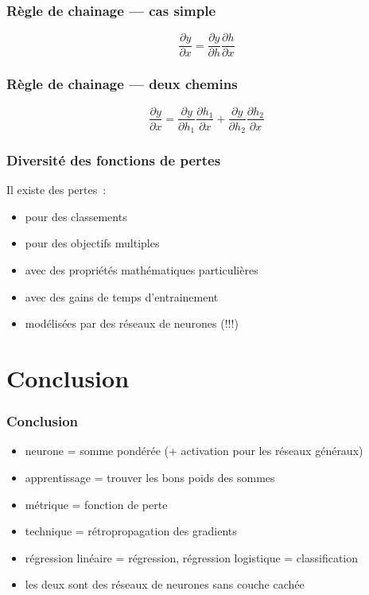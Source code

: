 \documentclass{formation}
\begin{document}
\begin{frame}
  \frametitle{Règle de chainage --- cas simple}

  \[
    \frac{\partial y}{\partial x} = \frac{\partial y}{\partial h}
    \frac{\partial h}{\partial x}
  \]
\end{frame}


\begin{frame}
  \frametitle{Règle de chainage --- deux chemins}

  \[
    \frac{\partial y}{\partial x} = \frac{\partial y}{\partial h_1}
    \frac{\partial h_1}{\partial x} + \frac{\partial y}{\partial h_2}
    \frac{\partial h_2}{\partial x}
  \]
\end{frame}

\begin{frame}
  \frametitle{Diversité des fonctions de pertes}

  Il existe des pertes :
  
  \begin{itemize}[<+->]
  \item pour des classements
  \item pour des objectifs multiples
  \item avec des propriétés mathématiques particulières
  \item avec des gains de temps d'entrainement
  \item modélisées par des réseaux de neurones (!!!)
  \end{itemize}

\end{frame}

\section{Conclusion}

\begin{frame}
  \frametitle{Conclusion}
  \begin{itemize}
  \item neurone = somme pondérée (+ activation pour les réseaux
    généraux)
  \item apprentissage = trouver les bons poids des sommes
  \item métrique = fonction de perte
  \item technique = rétropropagation des gradients
  \item régression linéaire = régression, régression logistique =
    classification
  \item les deux sont des réseaux de neurones sans couche cachée
  \end{itemize}
\end{frame}
\end{document}
